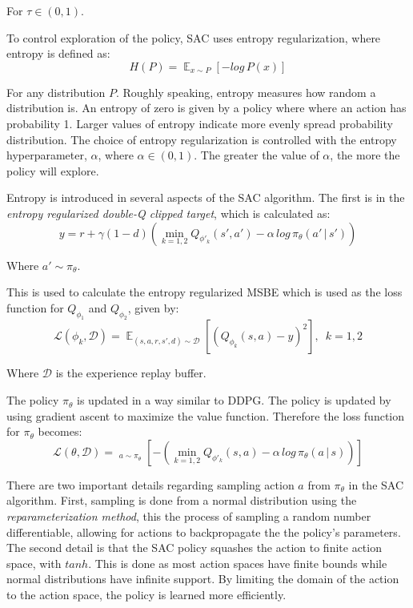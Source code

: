 \documentclass[conference]{IEEEtran}
\begin{document}
\begin{flushleft}
    For $\tau \in (0, 1)$.
\end{flushleft}

To control exploration of the policy, SAC uses entropy regularization, where entropy is defined as:
$$
    H(P) = \mathop{\mathbb{E}}_{x \sim P} \left[- log \, P(x)\right]
$$
\begin{flushleft}
    For any distribution $P$. Roughly speaking, entropy measures how random a distribution is. An entropy of zero is given by a policy where where an action has probability 1. Larger values of entropy indicate more evenly spread probability distribution. The choice of entropy regularization is controlled with the entropy hyperparameter, $\alpha$, where $\alpha \in (0, 1)$. The greater the value of $\alpha$, the more the policy will explore.
\end{flushleft}

Entropy is introduced in several aspects of the SAC algorithm. The first is in the \textit{entropy regularized double-Q clipped target}, which is calculated as:
$$
    y = r + \gamma(1-d)\left(\mathop{min}_{k=1,2}Q_{\phi'_k}(s', a') - \alpha \, log \, \pi_\theta(a' \, | \, s')\right)
$$

\begin{flushleft}
    Where $a' \sim \pi_\theta$.
\end{flushleft}

This is used to calculate the entropy regularized MSBE which is used as the loss function for $Q_{\phi_1}$ and $Q_{\phi_2}$, given by:
$$
    \mathcal{L}(\phi_k, \mathcal{D}) = \mathop{\mathbb{E}}_{(s,a,r,s',d) \sim \mathcal{D}}\left[\left(Q_{\phi_k}(s,a) - y\right)^2\right], \enspace k=1,2
$$
\begin{flushleft}
    Where $\mathcal{D}$ is the experience replay buffer.
\end{flushleft}

The policy $\pi_\theta$ is updated in a way similar to DDPG. The policy is updated by using gradient ascent to maximize the value function. Therefore the loss function for $\pi_\theta$ becomes:
$$
    \mathcal{L}(\theta, \mathcal{D}) = \mathop{\mathop{\mathbb{E}}_{s \sim \mathcal{D}}}_{a \sim \pi_\theta} \left[-\left(\mathop{min}_{k=1,2} Q_{\phi'_k}(s, a) - \alpha \, log \, \pi_\theta(a \, | \, s)\right)\right]
$$

There are two important details regarding sampling action $a$ from $\pi_\theta$ in the SAC algorithm. First, sampling is done from a normal distribution using the \textit{reparameterization method}, this the process of sampling a random number differentiable, allowing for actions to backpropagate the the policy's parameters. The second detail is that the SAC policy squashes the action to finite action space, with $tanh$. This is done as most action spaces have finite bounds while normal distributions have infinite support. By limiting the domain of the action to the action space, the policy is learned more efficiently.
\end{document}
